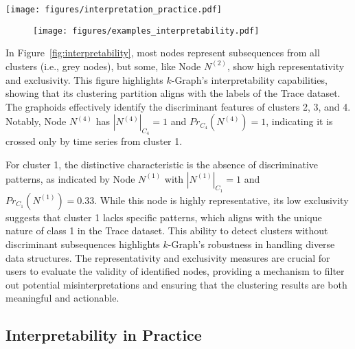 \begin{figure*}[tb]
 \centering
\texttt{[image: figures/interpretation\_practice.pdf]}
\vspace{-0.3cm}
 \caption{}
\vspace{-0.3cm}
\label{fig:interpretability_practice}
\end{figure*}

\begin{figure}[tb]
 \centering
\texttt{[image: figures/examples\_interpretability.pdf]}
\vspace{-0.4cm}
 \caption{}
\vspace{-0.5cm}
\label{fig:interpretability_ex}
\end{figure}

 In Figure~\ref{fig:interpretability}, most nodes represent subsequences from all clusters (i.e., grey nodes), but some, like Node $ N^{(2)} $, show high representativity and exclusivity. This figure highlights $k$-Graph's interpretability capabilities, showing that its clustering partition aligns with the labels of the Trace dataset. The graphoids effectively identify the discriminant features of clusters 2, 3, and 4. Notably, Node $ N^{(4)} $ has $ |N^{(4)}|_{C_4}=1 $ and $ Pr_{C_4}(N^{(4)})=1 $, indicating it is crossed only by time series from cluster 1.

For cluster 1, the distinctive characteristic is the absence of discriminative patterns, as indicated by Node $ N^{(1)} $ with $ |N^{(1)}|_{C_1}=1 $ and $ Pr_{C_1}(N^{(1)})=0.33 $. While this node is highly representative, its low exclusivity suggests that cluster 1 lacks specific patterns, which aligns with the unique nature of class 1 in the Trace dataset. This ability to detect clusters without discriminant subsequences highlights $k$-Graph's robustness in handling diverse data structures. The representativity and exclusivity measures are crucial for users to evaluate the validity of identified nodes, providing a mechanism to filter out potential misinterpretations and ensuring that the clustering results are both meaningful and actionable.


\subsection{Interpretability in Practice}

